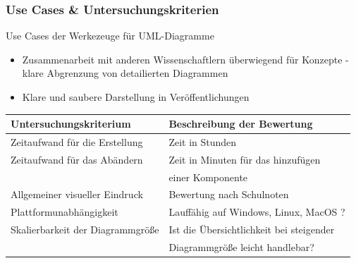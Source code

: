 \documentclass[xcolor=dvipsnames]{beamer}
\begin{document}
\begin{frame}
	\frametitle{Use Cases \& Untersuchungskriterien}
	\begin{block}{Use Cases der Werkezeuge für UML-Diagramme}
		\begin{itemize}
			\item Zusammenarbeit mit anderen Wissenschaftlern überwiegend für Konzepte - klare Abgrenzung von detailierten Diagrammen
			\item Klare und saubere Darstellung in Veröffentlichungen
		\end{itemize}
		
	\end{block}
	\begin{table}
		\begin{tabular}{l l}
			\toprule
			\textbf{Untersuchungskriterium} & \textbf{Beschreibung der Bewertung}\\
			\midrule
			Zeitaufwand für die Erstellung & Zeit in Stunden \\
			\midrule
			Zeitaufwand für das Abändern & Zeit in Minuten für das hinzufügen  \\
			& einer Komponente \\
			\midrule
			Allgemeiner visueller Eindruck & Bewertung nach Schulnoten\\
			\midrule
			Plattformunabhängigkeit &
			Lauffähig auf Windows, Linux, MacOS ? \\
			\midrule
			Skalierbarkeit der Diagrammgröße & Ist die Übersichtlichkeit bei steigender  \\
			& Diagrammgröße leicht handlebar? \\
			\bottomrule
		\end{tabular}
	\end{table}
	
	
	
\end{frame}
\end{document}
